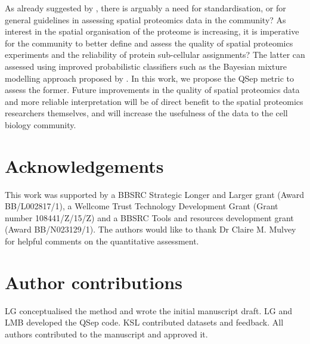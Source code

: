 \documentclass[12pt]{article}\usepackage[]{graphicx}\usepackage[]{color}
\begin{document}
As already suggested by \citet{Lund-Johansen:2016}, there is arguably
a need for standardisation, or for general guidelines in assessing
spatial proteomics data in the community? As interest in the spatial
organisation of the proteome is increasing, it is imperative for the
community to better define and assess the quality of spatial
proteomics experiments and the reliability of protein sub-cellular
assignments? The latter can assessed using improved probabilistic
classifiers such as the Bayesian mixture modelling approach proposed
by \citet{Crook:2018}. In this work, we propose the QSep metric to
assess the former. Future improvements in the quality of spatial
proteomics data and more reliable interpretation will be of direct
benefit to the spatial proteomics researchers themselves, and will
increase the usefulness of the data to the cell biology community.

\clearpage

\section*{Acknowledgements}

This work was supported by a BBSRC Strategic Longer and Larger grant
(Award BB/L002817/1), a Wellcome Trust Technology Development Grant
(Grant number 108441/Z/15/Z) and a BBSRC Tools and resources
development grant (Award BB/N023129/1). The authors would like to
thank Dr Claire M. Mulvey for helpful comments on the quantitative
assessment.

\section*{Author contributions}

LG conceptualised the method and wrote the initial manuscript
draft. LG and LMB developed the QSep code. KSL contributed datasets
and feedback. All authors contributed to the manuscript and approved
it.

\newpage
\end{document}
